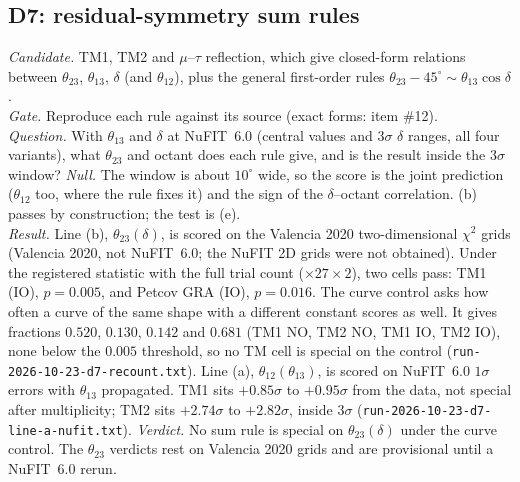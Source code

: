 \subsection{D7: residual-symmetry sum rules}\label{sec:D7}
\emph{Candidate.} TM1, TM2 and $\mu$--$\tau$ reflection, which give closed-form relations between
$\theta_{23}$, $\theta_{13}$, $\delta$ (and $\theta_{12}$), plus the general first-order rules
$\theta_{23}-45^\circ\sim\theta_{13}\cos\delta$.\\
\emph{Gate.} Reproduce each rule against its source (exact forms: item \#12).\\
\emph{Question.} With $\theta_{13}$ and $\delta$ at NuFIT~6.0 (central values and $3\sigma$
$\delta$ ranges, all four variants), what $\theta_{23}$ and octant does each rule give, and is the
result inside the $3\sigma$ window? \emph{Null.} The window is about $10^\circ$ wide, so the score
is the joint prediction ($\theta_{12}$ too, where the rule fixes it) and the sign of the
$\delta$--octant correlation. (b) passes by construction; the test is (e).\\
\emph{Result.} Line (b), $\theta_{23}(\delta)$, is scored on the Valencia 2020 two-dimensional $\chi^2$
grids (Valencia 2020, not NuFIT~6.0; the NuFIT 2D grids were not obtained). Under the registered
statistic with the full trial count ($\times27\times2$), two cells pass: TM1 (IO), $p=0.005$, and
Petcov GRA (IO), $p=0.016$. The curve control asks how often a curve of the same shape with a
different constant scores as well. It gives fractions $0.520$, $0.130$, $0.142$ and $0.681$ (TM1 NO,
TM2 NO, TM1 IO, TM2 IO), none below the $0.005$ threshold, so no TM cell is special on the control
(\texttt{run-2026-10-23-d7-recount.txt}). Line (a), $\theta_{12}(\theta_{13})$, is scored on
NuFIT~6.0 $1\sigma$ errors with $\theta_{13}$ propagated. TM1 sits $+0.85\sigma$ to $+0.95\sigma$
from the data, not special after multiplicity; TM2 sits $+2.74\sigma$ to $+2.82\sigma$, inside
$3\sigma$ (\texttt{run-2026-10-23-d7-line-a-nufit.txt}).\quad
\emph{Verdict.} No sum rule is special on $\theta_{23}(\delta)$ under the curve control. The
$\theta_{23}$ verdicts rest on Valencia 2020 grids and are provisional until a NuFIT~6.0 rerun.


